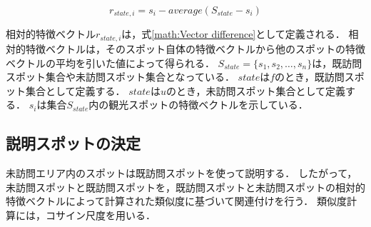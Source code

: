 \documentclass[submit,techrep,noauthor]{ipsj}
\begin{document}
%
\begin{equation}
  r_{state,i}=s_i-average(S_{state}-s_i)
  \label{math:Vector difference}
\end{equation}

相対的特徴ベクトル$r_{state,i}$は，式\ref{math:Vector difference}として定義される．
相対的特徴ベクトルは，そのスポット自体の特徴ベクトルから他のスポットの特徴ベクトルの平均を引いた値によって得られる．
$S_{state} =\{s_1,s_2,\dots,s_n\}$は，既訪問スポット集合や未訪問スポット集合となっている．
$state$は$f$のとき，既訪問スポット集合として定義する．
$state$は$u$のとき，未訪問スポット集合として定義する．
$s_i$は集合$S_{state}$内の観光スポットの特徴ベクトルを示している．

\subsection{説明スポットの決定}
\label{subsec:説明スポットの決定}
未訪問エリア内のスポットは既訪問スポットを使って説明する．
したがって，未訪問スポットと既訪問スポットを，既訪問スポットと未訪問スポットの相対的特徴ベクトルによって計算された類似度に基づいて関連付けを行う．
類似度計算には，コサイン尺度を用いる．
\end{document}
